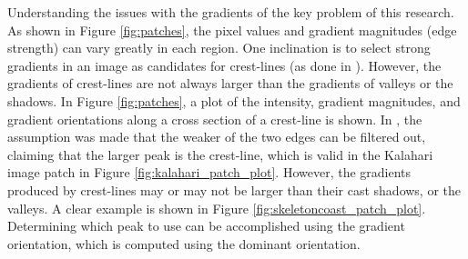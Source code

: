 Understanding the issues with the gradients of the key problem of this research. As shown in Figure \ref{fig:patches}, the pixel values and gradient magnitudes (edge strength) can vary greatly in each region. One inclination is to select strong gradients in an image as candidates for crest-lines (as done in \cite{2015_automated_mapping_of_linear_dunefield}). However, the gradients of crest-lines are not always larger than the gradients of valleys or the shadows. In Figure \ref{fig:patches}, a plot of the intensity, gradient magnitudes, and gradient orientations along a cross section of a crest-line is shown. In \cite{2015_automated_mapping_of_linear_dunefield}, the assumption was made that the weaker of the two edges can be filtered out, claiming that the larger peak is the crest-line, which is valid in the Kalahari image patch in Figure \ref{fig:kalahari_patch_plot}. However, the gradients produced by crest-lines may or may not be larger than their cast shadows, or the valleys. A clear example is shown in Figure \ref{fig:skeletoncoast_patch_plot}. Determining which peak to use can be accomplished using the gradient orientation, which is computed using the dominant orientation.


